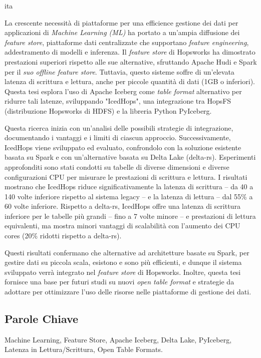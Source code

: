 \markboth{\abstractname}{}
\begin{scontents}[store-env=lang]
ita
\end{scontents}



\begin{scontents}[store-env=abstracts,print-env=true]
La crescente necessità di piattaforme per una efficience gestione dei dati per applicazioni di \textit{Machine Learning (ML)} ha portato a un'ampia diffusione dei \textit{feature store}, piattaforme dati centralizzate che supportano \textit{feature engineering}, addestramento di modelli e inferenza. Il \textit{feature store} di Hopsworks ha dimostrato prestazioni superiori rispetto alle sue alternative, sfruttando Apache Hudi e Spark per il \textit{suo offline feature store}. Tuttavia, questo sisteme soffre di un'elevata latenza di scrittura e lettura, anche per piccole quantità di dati (1GB o inferiori). Questa tesi esplora l'uso di Apache Iceberg come \textit{table format} alternativo per ridurre tali latenze, sviluppando "IcedHops", una integrazione tra HopsFS (distribuzione Hopsworks di HDFS) e la libreria Python PyIceberg.

Questa ricerca inizia con un'analisi delle possibili strategie di integrazione, documentando i vantaggi e i limiti di ciascun approccio. Successivamente, IcedHops viene sviluppato ed evaluato, confrondolo con la soluzione esistente basata su Spark e con un'alternative basata su Delta Lake (delta-rs). Esperimenti approfonditi sono stati condotti su tabelle di diverse dimensioni e diverse configurazioni CPU per misurare le prestazioni di scrittura e lettura. I risultati mostrano che IcedHops riduce significativamente la latenza di scrittura -- da 40 a 140 volte inferiore rispetto al sistema legacy -- e la latenza di lettura -- dal 55\% a 60 volte inferiore. Rispetto a delta-rs, IcedHops offre una latenza di scrittura inferiore per le tabelle più grandi -- fino a 7 volte minore -- e prestazioni di lettura equivalenti, ma mostra minori vantaggi di scalabilità con l'aumento dei CPU cores (20\% ridotti rispetto a delta-rs).

Questi risultati confermano che alternative ad architetture basate su Spark, per gestire dati su piccola scala, esistono e sono più efficienti, e dunque il sistema sviluppato verrà integrato nel \textit{feature store} di Hopsworks. Inoltre, questa tesi fornisce una base per futuri studi su nuovi \textit{open table format} e strategie da adottare per ottimizzare l'uso delle risorse nelle piattaforme di gestione dei dati.
\end{scontents}



\subsection*{Parole Chiave}
\begin{scontents}[store-env=keywords,print-env=true]
Machine Learning, Feature Store, Apache Iceberg, Delta Lake, PyIceberg, Latenza in Lettura/Scrittura, Open Table Formats.
\end{scontents}